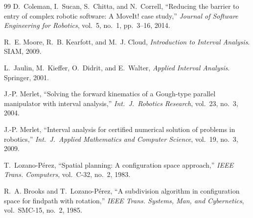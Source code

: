 \documentclass[journal]{IEEEtran}
\begin{document}
\begin{thebibliography}{99}
D.~Coleman, I.~Sucan, S.~Chitta, and N.~Correll, ``Reducing the
barrier to entry of complex robotic software: A MoveIt! case
study,'' \emph{Journal of Software Engineering for Robotics},
vol.~5, no.~1, pp.~3--16, 2014.

R.~E. Moore, R.~B. Kearfott, and M.~J. Cloud, \emph{Introduction to
Interval Analysis}. SIAM, 2009.

L.~Jaulin, M.~Kieffer, O.~Didrit, and E.~Walter, \emph{Applied
Interval Analysis}. Springer, 2001.

J.-P. Merlet, ``Solving the forward kinematics of a Gough-type
parallel manipulator with interval analysis,'' \emph{Int.\ J.\ Robotics
Research}, vol.~23, no.~3, 2004.

J.-P. Merlet, ``Interval analysis for certified numerical solution of
problems in robotics,'' \emph{Int.\ J.\ Applied Mathematics and
Computer Science}, vol.~19, no.~3, 2009.

T.~Lozano-P\'erez, ``Spatial planning: A configuration space
approach,'' \emph{IEEE Trans. Computers}, vol.~C-32, no.~2, 1983.

R.~A. Brooks and T.~Lozano-P\'erez, ``A subdivision algorithm in
configuration space for findpath with rotation,'' \emph{IEEE Trans.
Systems, Man, and Cybernetics}, vol.~SMC-15, no.~2, 1985.

\end{thebibliography}
\end{document}
